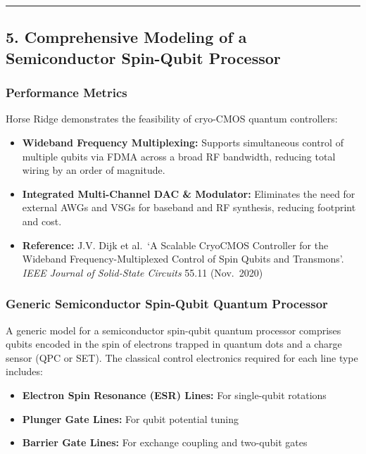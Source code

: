 \documentclass[
]{article}
\providecommand{\tightlist}{%
  \setlength{\itemsep}{0pt}\setlength{\parskip}{0pt}}
\begin{document}
\begin{center}\rule{0.5\linewidth}{0.5pt}\end{center}

\subsection{5. Comprehensive Modeling of a Semiconductor Spin-Qubit
Processor}\label{comprehensive-modeling-of-a-semiconductor-spin-qubit-processor}

\subsubsection{Performance Metrics}\label{performance-metrics}

Horse Ridge demonstrates the feasibility of cryo-CMOS quantum
controllers:

\begin{itemize}
\tightlist
\item
  \textbf{Wideband Frequency Multiplexing:} Supports simultaneous
  control of multiple qubits via FDMA across a broad RF bandwidth,
  reducing total wiring by an order of magnitude.
\item
  \textbf{Integrated Multi-Channel DAC \& Modulator:} Eliminates the
  need for external AWGs and VSGs for baseband and RF synthesis,
  reducing footprint and cost.
\item
  \textbf{Reference:} J.V. Dijk et al.~`A Scalable CryoCMOS Controller
  for the Wideband Frequency-Multiplexed Control of Spin Qubits and
  Transmons'. \emph{IEEE Journal of Solid-State Circuits} 55.11
  (Nov.~2020)
\end{itemize}

\subsubsection{Generic Semiconductor Spin-Qubit Quantum
Processor}\label{generic-semiconductor-spin-qubit-quantum-processor}

A generic model for a semiconductor spin-qubit quantum processor
comprises qubits encoded in the spin of electrons trapped in quantum
dots and a charge sensor (QPC or SET). The classical control electronics
required for each line type includes:

\begin{itemize}
\tightlist
\item
  \textbf{Electron Spin Resonance (ESR) Lines:} For single-qubit
  rotations
\item
  \textbf{Plunger Gate Lines:} For qubit potential tuning\\
\item
  \textbf{Barrier Gate Lines:} For exchange coupling and two-qubit gates
\end{itemize}
\end{document}
